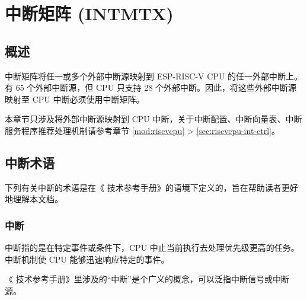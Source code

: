 \documentclass[main\_\_CN.tex]{subfiles}
\begin{document}

\ifglobal
\else
    {\let\clearpage\relax \listoftodos}
    {\let\clearpage\relax \listofdonetodos}
    \tableofcontents
\fi



\hypertarget{intmtrx}{}
\chapter{中断矩阵 (INTMTX)}
\label{mod:intmtrx}

\section{概述}

\chipname{} 中断矩阵将任一或多个外部中断源映射到 ESP-RISC-V CPU 的任一外部中断上。
\chipname{} 有 65 个外部中断源，但 CPU 只支持 28 个外部中断。因此，将这些外部中断源映射至 CPU 中断必须使用中断矩阵。

\begin{tiplisting}
本章节只涉及将外部中断源映射到 CPU 中断，关于中断配置、中断向量表、中断服务程序推荐处理机制请参考章节 \ref{mod:riscvcpu} \textit{} >  \ref{sec:riscvcpu-int-ctrl}\textit{}。
\end{tiplisting}
\vspace{-1em}
\section{\chipname{} 中断术语}\label{sec:intmtx-int-terminology}

下列有关中断的术语是在《\chipname{} 技术参考手册》的语境下定义的，旨在帮助读者更好地理解本文档。

\subsection{中断}

中断指的是在特定事件或条件下，CPU 中止当前执行去处理优先级更高的任务。中断机制使 CPU 能够迅速响应特定的事件。

《\chipname{} 技术参考手册》里涉及的“中断”是个广义的概念，可以泛指中断信号或中断源。
\end{document}
